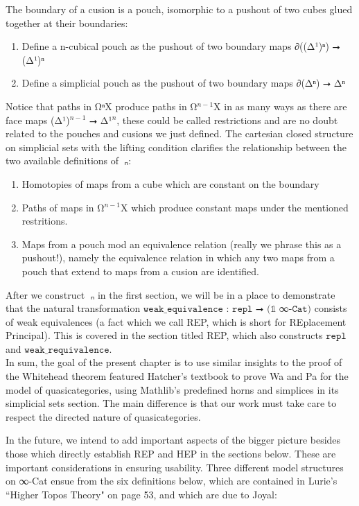 \documentclass{book}
\theoremstyle{definition}
\begin{document}
The boundary of a cusion is a pouch, isomorphic to a pushout of two cubes glued together at their boundaries:

\begin{enumerate}
\item Define a n-cubical pouch as the pushout of two boundary maps ∂((Δ¹)ⁿ) ⭢ (Δ¹)ⁿ
\item Define a simplicial pouch as the pushout of two boundary maps ∂(Δⁿ) ⭢ Δⁿ
\end{enumerate}

Notice that paths in Ω⃗ⁿX produce paths in Ω⃗${}^{n-1}$X in as many ways as there are face maps (Δ¹)${}^{n-1}$ ⭢ Δ¹${}^{n}$, these could be called restrictions and are no doubt related to the pouches and cusions we just defined. The cartesian closed structure on simplicial sets with the lifting condition clarifies the relationship between the two available definitions of π⃗ₙ:

\begin{enumerate}
\item Homotopies of maps from a cube which are constant on the boundary
\item Paths of maps in Ω⃗${}^{n-1}$X which produce constant maps under the mentioned restritions.
\item Maps from a pouch mod an equivalence relation (really we phrase this as a pushout!), namely the equivalence relation in which any two maps from a pouch that extend to maps from a cusion are identified.
\end{enumerate}

After we construct π⃗ₙ in the first section, we will be in a place to demonstrate that the natural transformation $\texttt{weak\_equivalence : repl ⭢ (𝟙 }$∞$\texttt{-Cat)}$ consists of weak equivalences (a fact which we call REP, which is short for REplacement Principal). This is covered in the section titled REP, which also constructs $\texttt{repl}$ and $\texttt{weak\_requivalence}$.\\

In sum, the goal of the present chapter is to use similar insights to the proof of the Whitehead theorem featured Hatcher's textbook to prove Wa and Pa for the model of quasicategories, using Mathlib's predefined horns and simplices in its simplicial sets section. The main difference is that our work must take care to respect the directed nature of quasicategories.\\
\fi

\iffalse
In the future, we intend to add important aspects of the bigger picture besides those which directly establish REP and HEP in the sections below. These are important considerations in ensuring usability. Three different model structures on ∞-Cat ensue from the six definitions below, which are contained in Lurie's ``Higher Topos Theory" on page 53, and which are due to Joyal:
\end{document}

